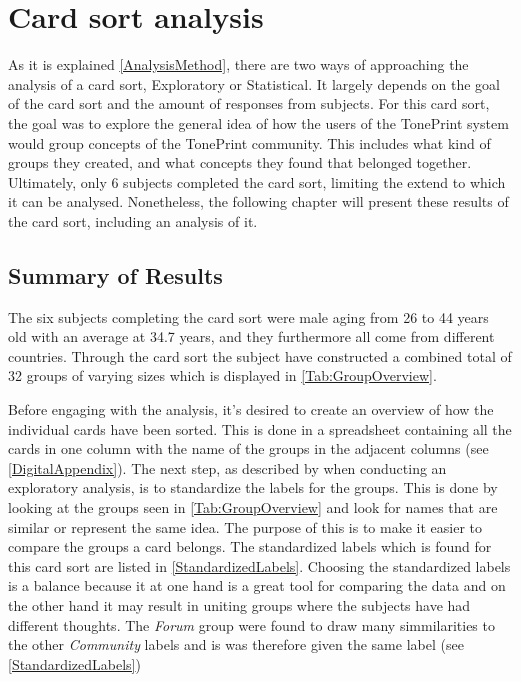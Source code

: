 \chapter{Card sort analysis}
\label{CardSortAnalysis}
As it is explained \autoref{AnalysisMethod}, there are two ways of approaching the analysis of a card sort, Exploratory or Statistical. It largely depends on the goal of the card sort and the amount of responses from subjects. For this card sort, the goal was to explore the general idea of how the users of the TonePrint system would group concepts of the TonePrint community. This includes what kind of groups they created, and what concepts they found that belonged together. Ultimately, only 6 subjects completed the card sort, limiting the extend to which it can be analysed. Nonetheless, the following chapter will present these results of the card sort, including an analysis of it.

\section{Summary of Results}
\label{SummaryResults}
The six subjects completing the card sort were male aging from 26 to 44 years old with an average at 34.7 years, and they furthermore all come from different countries. Through the card sort the subject have constructed a combined total of 32 groups of varying sizes which is displayed in \autoref{Tab:GroupOverview}.

Before engaging with the analysis, it's desired to create an overview of how the individual cards have been sorted. This is done in a spreadsheet containing all the cards in one column with the name of the groups in the adjacent columns (see \autoref{DigitalAppendix}). The next step, as described by \textcite[184]{WEB:DonnaSpencer} when conducting an exploratory analysis, is to standardize the labels for the groups. This is done by looking at the groups seen in \autoref{Tab:GroupOverview} and look for names that are similar or represent the same idea. The purpose of this is to make it easier to compare the groups a card belongs. The standardized labels which is found for this card sort are listed in \autoref{StandardizedLabels}. Choosing the standardized labels is a balance because it at one hand is a great tool for comparing the data and on the other hand it may result in uniting groups where the subjects have had different thoughts. The \textit{Forum} group were found to draw many simmilarities to the other \textit{Community} labels and is was therefore given the same label (see \autoref{StandardizedLabels}) \\ 

